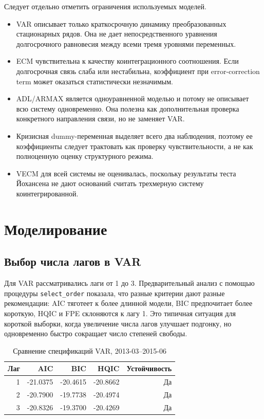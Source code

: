 \documentclass[12pt,a4paper]{article}
\begin{document}
Следует отдельно отметить ограничения используемых моделей.
\begin{itemize}
\item VAR описывает только краткосрочную динамику преобразованных стационарных рядов. Она
не дает непосредственного уравнения долгосрочного равновесия между всеми тремя уровнями
переменных.
\item ECM чувствительна к качеству коинтеграционного соотношения. Если долгосрочная связь
слаба или нестабильна, коэффициент при error-correction term может оказаться статистически
незначимым.
\item ADL/ARMAX является одноуравненной моделью и потому не описывает всю систему
одновременно. Она полезна как дополнительная проверка конкретного направления связи, но не
заменяет VAR.
\item Кризисная dummy-переменная выделяет всего два наблюдения, поэтому ее коэффициенты
следует трактовать как проверку чувствительности, а не как полноценную оценку структурного
режима.
\item VECM для всей системы не оценивалась, поскольку результаты теста Йохансена не дают
оснований считать трехмерную систему коинтегрированной.
\end{itemize}

\section{Моделирование}
\subsection{Выбор числа лагов в VAR}
Для VAR рассматривались лаги от 1 до 3. Предварительный анализ с помощью процедуры
\texttt{select\_order} показала, что разные критерии дают разные рекомендации: AIC тяготеет к
более длинной модели, BIC предпочитает более короткую, HQIC и FPE склоняются к лагу 1.
Это типичная ситуация для короткой выборки, когда увеличение числа лагов улучшает подгонку,
но одновременно быстро сокращает число степеней свободы.

\begin{table}[H]
\centering
\caption{Сравнение спецификаций VAR, 2013-03--2015-06}
\begin{tabular}{rrrrr}
\toprule
Лаг & AIC & BIC & HQIC & Устойчивость \\
\midrule
1 & -21.0375 & -20.4615 & -20.8662 & Да \\
2 & -20.7900 & -19.7738 & -20.4974 & Да \\
3 & -20.8326 & -19.3700 & -20.4269 & Да \\
\bottomrule
\end{tabular}
\end{table}
\end{document}
